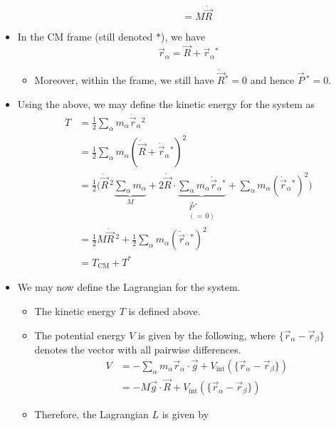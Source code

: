 \documentclass[../notes.tex]{subfiles}
\begin{document}
\begin{itemize}
\begin{itemize}
\begin{equation*}
            = M\dot{\vec{R}}
        \end{equation*}
    \end{itemize}
    \item In the CM frame (still denoted $*$), we have
    \begin{equation*}
        \vec{r}_\alpha = \vec{R}+\vec{r}_\alpha{}^*
    \end{equation*}
    \begin{itemize}
        \item Moreover, within the frame, we still have $\dot{\vec{R}}{}^*=0$ and hence $\vec{P}{\,}^*=0$.
    \end{itemize}
    \item Using the above, we may define the kinetic energy for the system as
    \begin{align*}
        T &= \frac{1}{2}\sum_\alpha m_\alpha\dot{\vec{r}}_\alpha{}^2\\
        &= \frac{1}{2}\sum_\alpha m_\alpha(\dot{\vec{R}}+\dot{\vec{r}}_\alpha{}^*)^2\\
        &= \frac{1}{2}\Bigg( \dot{\vec{R}}{\,}^2\underbrace{\sum_\alpha m_\alpha}_M+2\dot{\vec{R}}\cdot\underbrace{\sum_\alpha m_\alpha\dot{\vec{r}}_\alpha{}^*}_{\substack{\vec{P}{\,}^*\\(=\,0)}}+\sum_\alpha m_\alpha(\dot{\vec{r}}_\alpha{}^*)^2 \Bigg)\\
        &= \frac{1}{2}M\dot{\vec{R}}{\,}^2+\frac{1}{2}\sum_\alpha m_\alpha(\dot{\vec{r}}_\alpha{}^*)^2\\
        &= T_\text{CM}+T^*
    \end{align*}
    \item We may now define the Lagrangian for the system.
    \begin{itemize}
        \item The kinetic energy $T$ is defined above.
        \item The potential energy $V$ is given by the following, where $\{\vec{r}_\alpha-\vec{r}_\beta\}$ denotes the vector with all pairwise differences.
        \begin{align*}
            V &= -\sum_\alpha m_\alpha\vec{r}_\alpha\cdot\vec{g}+V_\text{int}(\{\vec{r}_\alpha-\vec{r}_\beta\})\\
            &= -M\vec{g}\cdot\vec{R}+V_\text{int}(\{\vec{r}_\alpha-\vec{r}_\beta\})
        \end{align*}
        \item Therefore, the Lagrangian $L$ is given by
        \begin{align*}

\end{align*}
\end{itemize}
\end{itemize}
\end{document}
